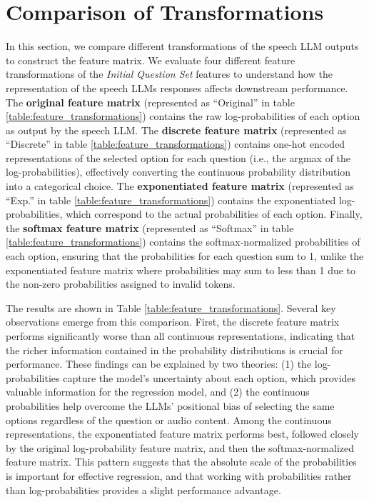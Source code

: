 \documentclass{report}
\begin{document}
\section{Comparison of Transformations}
\label{sec:comparison_of_transformations}
In this section, we compare different transformations of the speech LLM outputs to construct the feature matrix. We evaluate four different feature transformations of the \emph{Initial Question Set} features to understand how the representation of the speech LLMs responses affects downstream performance. The \textbf{original feature matrix} (represented as ``Original'' in table \ref{table:feature_transformations}) contains the raw log-probabilities of each option as output by the speech LLM. The \textbf{discrete feature matrix} (represented as ``Discrete'' in table \ref{table:feature_transformations}) contains one-hot encoded representations of the selected option for each question (i.e., the argmax of the log-probabilities), effectively converting the continuous probability distribution into a categorical choice. The \textbf{exponentiated feature matrix} (represented as ``Exp.'' in table \ref{table:feature_transformations}) contains the exponentiated log-probabilities, which correspond to the actual probabilities of each option. Finally, the \textbf{softmax feature matrix} (represented as ``Softmax'' in table \ref{table:feature_transformations}) contains the softmax-normalized probabilities of each option, ensuring that the probabilities for each question sum to 1, unlike the exponentiated feature matrix where probabilities may sum to less than 1 due to the non-zero probabilities assigned to invalid tokens.

The results are shown in Table \ref{table:feature_transformations}. Several key observations emerge from this comparison. First, the discrete feature matrix performs significantly worse than all continuous representations, indicating that the richer information contained in the probability distributions is crucial for performance. These findings can be explained by two theories: (1) the log-probabilities capture the model's uncertainty about each option, which provides valuable information for the regression model, and (2) the continuous probabilities help overcome the LLMs' positional bias \citep{liusie2023mitigatingwordbiaszeroshot} of selecting the same options regardless of the question or audio content. Among the continuous representations, the exponentiated feature matrix performs best, followed closely by the original log-probability feature matrix, and then the softmax-normalized feature matrix. This pattern suggests that the absolute scale of the probabilities is important for effective regression, and that working with probabilities rather than log-probabilities provides a slight performance advantage.
\end{document}
